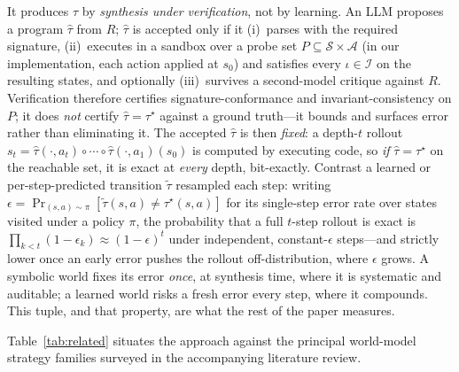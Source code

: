\documentclass[11pt]{article}
\begin{document}
It produces $\tau$ by \emph{synthesis under verification}, not by learning. An
LLM proposes a program $\hat\tau$ from $R$; $\hat\tau$ is accepted only if it
(i)~parses with the required signature, (ii)~executes in a sandbox over a probe
set $P \subseteq \mathcal{S} \times \mathcal{A}$ (in our implementation, each
action applied at $s_0$) and satisfies every $\iota \in \mathcal{I}$ on the
resulting states, and optionally (iii)~survives a second-model critique against
$R$. Verification therefore certifies signature-conformance and
invariant-consistency on $P$; it does \emph{not} certify $\hat\tau = \tau^\star$
against a ground truth---it bounds and surfaces error rather than eliminating it.
The accepted $\hat\tau$ is then \emph{fixed}: a depth-$t$ rollout $s_t =
\hat\tau(\cdot, a_t) \circ \cdots \circ \hat\tau(\cdot, a_1)(s_0)$ is computed by
executing code, so \emph{if} $\hat\tau = \tau^\star$ on the reachable set, it is
exact at \emph{every} depth, bit-exactly. Contrast a learned or
per-step-predicted transition $\tilde\tau$ resampled each step: writing
$\epsilon = \Pr_{(s,a)\sim\pi}[\tilde\tau(s, a) \neq \tau^\star(s, a)]$ for its
single-step error rate over states visited under a policy $\pi$, the probability
that a full $t$-step rollout is exact is $\prod_{k<t}(1 - \epsilon_k) \approx
(1 - \epsilon)^t$ under independent, constant-$\epsilon$ steps---and strictly
lower once an early error pushes the rollout off-distribution, where $\epsilon$
grows. A symbolic world fixes its error \emph{once}, at synthesis time, where it
is systematic and auditable; a learned world risks a fresh error every step,
where it compounds. This tuple, and that property, are what the rest of the paper
measures.

Table~\ref{tab:related} situates the approach against the principal
world-model strategy families surveyed in the accompanying literature review.
\end{document}
